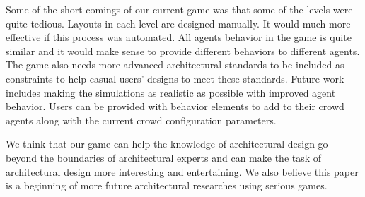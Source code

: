 Some of the short comings of our current game was that some of the levels were quite tedious. Layouts in each level are designed manually. It would much more effective if this process was automated. All agents behavior in the game is quite similar and it would make sense to provide different behaviors to different agents. The game also needs more advanced architectural standards to be included as constraints to help casual users' designs to meet these standards. Future work includes making the simulations as realistic as possible with improved agent behavior. Users can be provided with behavior elements to add to their crowd agents along with the current crowd configuration parameters.

We think that our game can help the knowledge of architectural design go beyond the boundaries of architectural experts and can make the task of architectural design more interesting and entertaining. We also believe this paper is a beginning of more future architectural researches using serious games.
 

 
